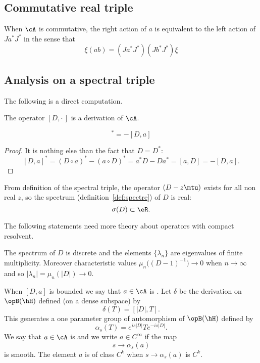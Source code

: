 \subsection{Commutative real triple}

When $\cA$ is commutative, the right action of $a$ is equivalent to the left action of $Ja^*J^*$ in the sense that
\[
	\xi(ab)=(Ja^*J^*)(Jb^*J^*)\xi
\]

\subsection{Analysis on a spectral triple}

The following is a direct computation.
\begin{lemma}
	The operator $[D,\cdot\,]$ is a derivation of $\cA$.
\end{lemma}

\begin{lemma}
	\begin{equation}
		[D,a]^*=-[D,a]
	\end{equation}

\end{lemma}
\begin{proof}
	It is nothing else than the fact that $D=D^*$:
	\[
		[D,a]^*=(D\circ a)^*-(a\circ D)^*=a^*D-Da^*=[a,D]=-[D,a].
	\]

\end{proof}

From definition of the spectral triple, the operator $(D-z\mtu)$ exists for all non real $z$, so the spectrum (definition~\ref{def:spectre}) of $D$ is real:
\[
	\sigma(D)\subset \eR.
\]

\begin{probleme}
	The following statements need more theory about operators with compact resolvent.
\end{probleme}

The spectrum of $D$ is discrete and the elements $\{ \lambda_n \}$ are eigenvalues of finite multiplicity. Moreover characteristic values $\mu_n\big( (D-1)^{-1} \big)\to 0$ when $n\to\infty$ and so $| \lambda_n |=\mu_n(| D |)\to0$.

When $[D,a]$ is bounded we say that $a\in\cA$ is . Let $\delta$ be the derivation on $\opB(\hH)$ defined (on a dense subspace) by
\[
	\delta(T)=[| D |,T].
\]
This generates a one parameter group of automorphism of $\opB(\hH)$ defined by
\begin{equation}
	\alpha_s(T)= e^{is| D |}T e^{-is| D |}.
\end{equation}
We say that $a\in\cA$ is  and we write $a\in C^{\infty}$ if the map
\[
	s\to\alpha_s(a)
\]
is smooth. The element $a$ is of class $C^k$ when $s\to\alpha_s(a)$ is $C^k$.


